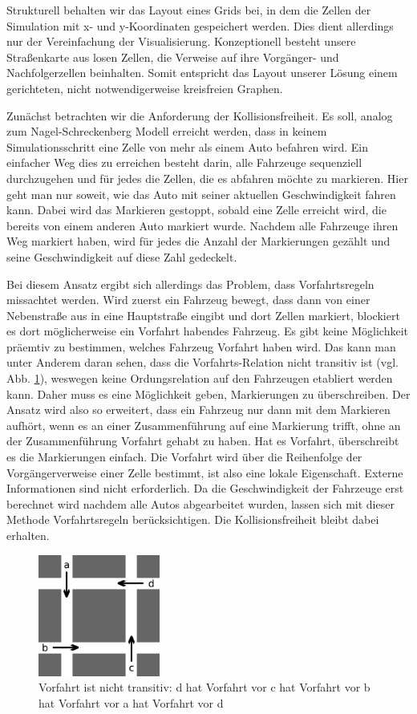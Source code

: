 \documentclass[10pt, a4paper]{article}
\begin{document}
Strukturell behalten wir das Layout eines Grids bei, in dem die Zellen der Simulation mit x- und y-Koordinaten gespeichert werden. Dies dient allerdings nur der Vereinfachung der Visualisierung. Konzeptionell besteht unsere Straßenkarte aus losen Zellen, die Verweise auf ihre Vorgänger- und Nachfolgerzellen beinhalten. Somit entspricht das Layout unserer Lösung einem gerichteten, nicht notwendigerweise kreisfreien Graphen.

Zunächst betrachten wir die Anforderung der Kollisionsfreiheit. Es soll, analog zum Nagel-Schreckenberg Modell \cite{nagel-schreckenberg} erreicht werden, dass in keinem Simulationsschritt eine Zelle von mehr als einem Auto befahren wird. Ein einfacher Weg dies zu erreichen besteht darin, alle Fahrzeuge sequenziell durchzugehen und für jedes die Zellen, die es abfahren möchte zu markieren. Hier geht man nur soweit, wie das Auto mit seiner aktuellen Geschwindigkeit fahren kann. Dabei wird das Markieren gestoppt, sobald eine Zelle erreicht wird, die bereits von einem anderen Auto markiert wurde. Nachdem alle Fahrzeuge ihren Weg markiert haben, wird für jedes die Anzahl der Markierungen gezählt und seine Geschwindigkeit auf diese Zahl gedeckelt.

Bei diesem Ansatz ergibt sich allerdings das Problem, dass Vorfahrtsregeln missachtet werden. Wird zuerst ein Fahrzeug bewegt, dass dann von einer Nebenstraße aus in eine Hauptstraße eingibt und dort Zellen markiert, blockiert es dort möglicherweise ein Vorfahrt habendes Fahrzeug. Es gibt keine Möglichkeit präemtiv zu bestimmen, welches Fahrzeug Vorfahrt haben wird. Das kann man unter Anderem daran sehen, dass die Vorfahrts-Relation nicht transitiv ist (vgl. Abb. \ref{fig:rightOfWayNotTransitive}), weswegen keine Ordungsrelation auf den Fahrzeugen etabliert werden kann. Daher muss es eine Möglichkeit geben, Markierungen zu überschreiben. Der Ansatz wird also so erweitert, dass ein Fahrzeug nur dann mit dem Markieren aufhört, wenn es an einer Zusammenführung auf eine Markierung trifft, ohne an der Zusammenführung Vorfahrt gehabt zu haben. Hat es Vorfahrt, überschreibt es die Markierungen einfach. Die Vorfahrt wird über die Reihenfolge der Vorgängerverweise einer Zelle bestimmt, ist also eine lokale Eigenschaft. Externe Informationen sind nicht erforderlich. Da die Geschwindigkeit der Fahrzeuge erst berechnet wird nachdem alle Autos abgearbeitet wurden, lassen sich mit dieser Methode Vorfahrtsregeln berücksichtigen. Die Kollisionsfreiheit bleibt dabei erhalten.
\begin{figure}[h!]
	\centering
	\includegraphics[width=4cm]{img/rightOfWay}
	\caption{Vorfahrt ist nicht transitiv: d hat Vorfahrt vor c hat Vorfahrt vor b hat Vorfahrt vor a hat Vorfahrt vor d}
	\label{fig:rightOfWayNotTransitive}
\end{figure}
\end{document}
